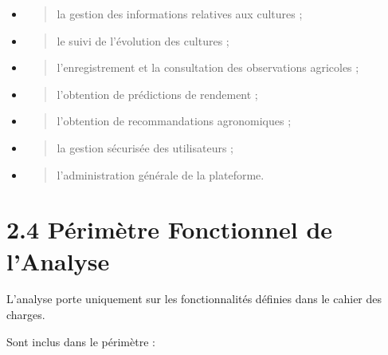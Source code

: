 \documentclass[
]{book}
\begin{document}
\begin{itemize}
\item
  \begin{quote}
  la gestion des informations relatives aux cultures ;
  \end{quote}
\item
  \begin{quote}
  le suivi de l'évolution des cultures ;
  \end{quote}
\item
  \begin{quote}
  l'enregistrement et la consultation des observations agricoles ;
  \end{quote}
\item
  \begin{quote}
  l'obtention de prédictions de rendement ;
  \end{quote}
\item
  \begin{quote}
  l'obtention de recommandations agronomiques ;
  \end{quote}
\item
  \begin{quote}
  la gestion sécurisée des utilisateurs ;
  \end{quote}
\item
  \begin{quote}
  l'administration générale de la plateforme.
  \end{quote}
\end{itemize}

\hypertarget{puxe9rimuxe8tre-fonctionnel-de-lanalyse}{%
\section{2.4 Périmètre Fonctionnel de
l'Analyse}\label{puxe9rimuxe8tre-fonctionnel-de-lanalyse}}

L'analyse porte uniquement sur les fonctionnalités définies dans le
cahier des charges.

Sont inclus dans le périmètre :
\end{document}
